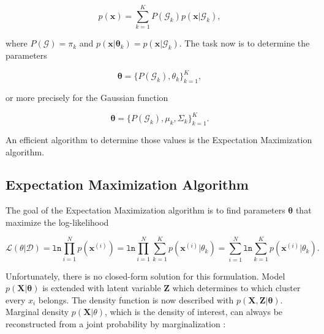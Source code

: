 \begin{equation}
	p(\mathbf{x}) = \sum_{k=1}^{K} P(\mathcal{G}_k) p(\mathbf{x} | \mathcal{G}_k),
\end{equation}

where $P(\mathcal{G}) = \pi_k$ and $ p(\mathbf{x} | \boldsymbol \theta_k) =  p(\mathbf{x} | \mathcal{G}_k)$. The task now is to determine the parameters

\begin{equation}
	 \boldsymbol \theta = \{ P(\mathcal{G}_k),  \theta_k \}_{k=1}^K,
\end{equation}


or more precisely for the Gaussian function

\begin{equation}
	 \boldsymbol \theta = \{ P(\mathcal{G}_k), \mu_k, \Sigma_k \}_{k=1}^K.
\end{equation}


An efficient algorithm to determine those values is the Expectation Maximization algorithm.




\subsection{Expectation Maximization Algorithm}

The goal of the Expectation Maximization algorithm is to find parameters $\boldsymbol \theta$ that maximize the log-likelihood 

\begin{equation}
	\mathcal{L}(\theta | \mathcal{D}) = \mathtt{ln}\prod_{i=1}^{N}p(\mathbf{x}^{(i)}) = \mathtt{ln}\prod_{i=1}^{N}\sum_{k=1}^{K}p(\mathbf{x}^{(i)} | \theta_k) = \sum_{i=1}^{N}\mathtt{ln}\sum_{k=1}^{K}p(\mathbf{x}^{(i)} | \theta_k).
\end{equation}

Unfortunately, there is no closed-form solution for this formulation. Model $p( \mathbf{X} | \boldsymbol \theta)$ is extended with latent variable $\mathbf{Z}$ which determines to which cluster  every $x_i$ belongs. The density function is now described with $p(\mathbf{X}, \mathbf{Z} | \boldsymbol \theta)$. Marginal density $p(\mathbf{X} | \theta)$, which is the density of interest, can always be reconstructed from a joint probability by marginalization :

